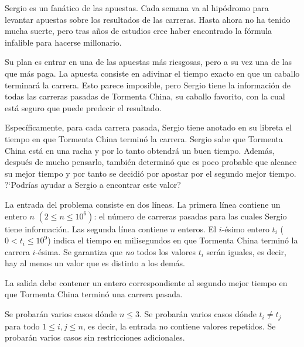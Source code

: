 \documentclass{oci}
\title{\caballo}
\newcommand{\caballo}{Tormenta China\xspace}
\begin{document}
\begin{problemDescription}
Sergio es un fanático de las apuestas.
Cada semana va al hipódromo para levantar apuestas sobre los resultados de las carreras.
Hasta ahora no ha tenido mucha suerte, pero tras años de estudios cree haber encontrado la
fórmula infalible para hacerse millonario.

Su plan es entrar en una de las apuestas más riesgosas, pero a su vez una de las que más paga.
La apuesta consiste en adivinar el tiempo exacto en que un caballo terminará la carrera.
Esto parece imposible, pero Sergio tiene la información de todas las carreras pasadas de \caballo,
su caballo favorito, con la cual está seguro que puede predecir el resultado.

Específicamente, para cada carrera pasada, Sergio tiene anotado en su libreta el tiempo en que
\caballo terminó la carrera.
Sergio sabe que \caballo está en una racha y por lo tanto obtendrá un buen tiempo.
Además, después de mucho pensarlo, también determinó que es poco probable que alcance su mejor tiempo y por
tanto se decidió por apostar por el segundo mejor tiempo.
?`Podrías ayudar a Sergio a encontrar este valor?
\end{problemDescription}

\begin{inputDescription}
La entrada del problema consiste en dos líneas.
La primera línea contiene un entero $n$ $(2 \le n \le 10^6)$: el número de carreras pasadas para
las cuales Sergio tiene información.
Las segunda línea contiene $n$ enteros.
El $i$-ésimo entero $t_i$ ($0 < t_i \leq 10^9$) indica el tiempo en milisegundos en que \caballo
terminó la carrera $i$-ésima.
Se garantiza que \emph{no} todos los valores $t_i$ serán iguales, es decir, hay al menos un valor
que es distinto a los demás.
\end{inputDescription}

\begin{outputDescription}
La salida debe contener un entero correspondiente al segundo mejor tiempo en que \caballo
terminó una carrera pasada.
\end{outputDescription}

\begin{scoreDescription}
  Se probarán varios casos dónde $n \le 3$.
  Se probarán varios casos dónde $t_i\ne t_j$ para todo $1 \leq i, j \leq n$,
  es decir, la entrada no contiene valores repetidos.
  Se probarán varios casos sin restricciones adicionales.
\end{scoreDescription}

\begin{sampleDescription}
\end{sampleDescription}
\end{document}
